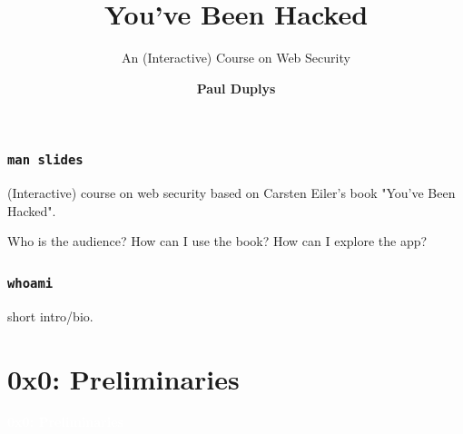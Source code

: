 \documentclass[aspectratio=169]{beamer}
\title{\textbf{You've Been Hacked}}
\subtitle{An (Interactive) Course on Web Security\newline\vfill}
\author{\textbf{Paul Duplys}}
\institute[]{\faTwitter\hspace{0.1cm} @duplys \hspace{1cm} \faGithub\hspace{0.1cm} duplys \hspace{1cm} \faLinkedinSquare\hspace{0.1cm} linkedin.com/in/paulduplys/}
\date{}
\begin{document}
{
\begin{frame}
    \titlepage
\end{frame}
}

\begin{frame}
    \tableofcontents
\end{frame}

\begin{frame}
    \frametitle{\texttt{man slides}}

    (Interactive) course on web security based on Carsten Eiler's book "You've Been Hacked".
    
    Who is the audience? How can I use the book? How can I explore the app?
\end{frame}

\begin{frame}
    \frametitle{\texttt{whoami}}
    short intro/bio.
\end{frame}


\section{0x0: Preliminaries}

{
\begin{frame}
\huge{\textcolor{white}{\textbf{0x0: Preliminaries}}}
\end{frame}
}
\end{document}
